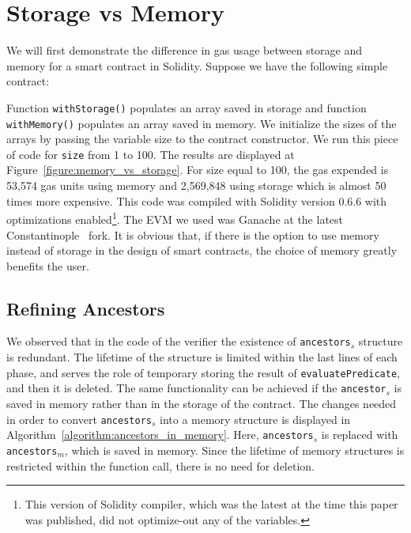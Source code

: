 % 

\section{Storage vs Memory}

We will first demonstrate the difference in gas usage between storage and
memory for a smart contract in Solidity. Suppose we have the following simple
contract:



Function \texttt{withStorage()} populates an array saved in storage and
function \texttt{withMemory()} populates an array saved in memory. We
initialize the sizes of the arrays by passing the variable \textsf{size} to the
contract constructor. We run this piece of code for \texttt{size} from 1 to
100. The results are displayed at Figure~\ref{figure:memory_vs_storage}. For
\textsf{size} equal to 100, the gas expended is 53,574 gas units using memory
and 2,569,848 using storage which is almost 50 times more expensive. This code
was compiled with Solidity version 0.6.6 with optimizations
enabled\footnote{This version of Solidity compiler, which was the latest at the
time this paper was published, did not optimize-out any of the variables.}. The
EVM we used  was Ganache at the latest Constantinople~\cite{constantinople}
fork. It is obvious that, if there is the option to use memory instead of
storage in the design of smart contracts, the choice of memory greatly benefits
the user.



\subsection{Refining Ancestors}

We observed that in the code of the verifier the existence of
\texttt{ancestors}$_s$ structure is redundant. The lifetime of the structure is
limited within the last lines of each phase, and serves the role of temporary
storing the result of \texttt{evaluatePredicate}, and then it is deleted. The
same functionality can be achieved if the \texttt{ancestor}$_s$ is saved in
memory rather than in the storage of the contract. The changes needed in order
to convert \texttt{ancestors}$_s$ into a memory structure is displayed in
Algorithm~\ref{algorithm:ancestors_in_memory}. Here, \texttt{ancestors}$_s$ is
replaced with \texttt{ancestors}$_{m}$, which is saved in memory. Since the
lifetime of memory structures is restricted within the function call, there is
no need for deletion.

